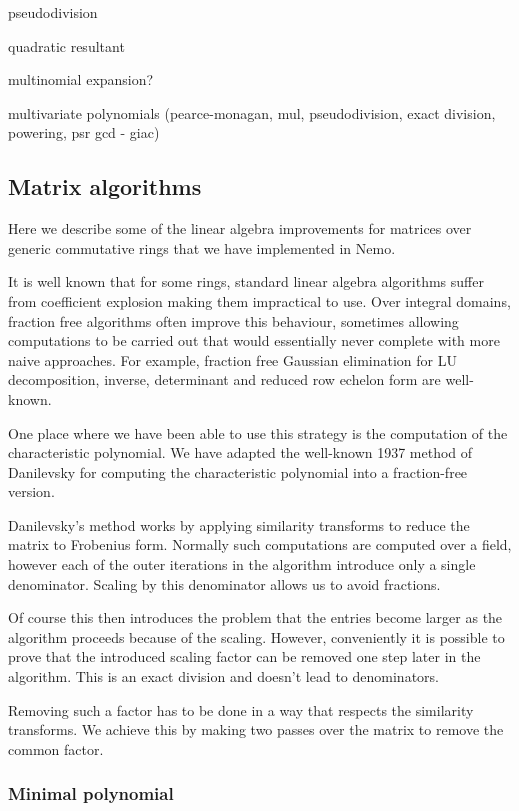 \documentclass{sig-alternate-05-2015}
\begin{document}
pseudodivision

quadratic resultant

multinomial expansion?

multivariate polynomials (pearce-monagan, mul, pseudodivision, exact division, powering, psr gcd - giac)

\subsection{Matrix algorithms}

Here we describe
some of the linear algebra improvements for matrices over generic commutative
rings that we have implemented in Nemo.

It is well known that for some rings, standard linear algebra algorithms
suffer from coefficient explosion making them impractical to use.
Over integral domains, fraction
free algorithms often improve this behaviour, sometimes allowing computations
to be carried out that would essentially never complete with more naive
approaches. For example, fraction free Gaussian elimination
for LU decomposition, inverse, determinant and reduced row echelon form
are well-known.

One place where we have been able to use this strategy is the computation
of the characteristic polynomial. We have adapted the well-known 1937 method
of Danilevsky for computing the characteristic polynomial into a fraction-free
version.

Danilevsky's method works by applying similarity transforms to reduce the
matrix to Frobenius form. Normally such computations are computed over a
field, however each of the outer iterations in the algorithm introduce only
a single denominator. Scaling by this denominator allows us to avoid
fractions.

Of course this then introduces the problem that the entries become larger
as the algorithm proceeds because of the scaling. However, conveniently
it is possible to prove that the introduced scaling factor can be removed 
one step later in the algorithm. This is an exact division and doesn't
lead to denominators.

Removing such a factor has to be done in a way that respects the
similarity transforms. We achieve this by making two passes over the matrix
to remove the common factor.

\subsubsection{Minimal polynomial}
\end{document}
